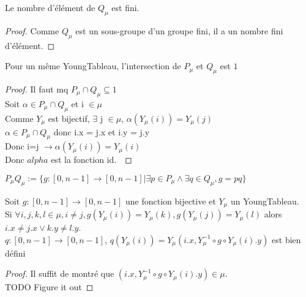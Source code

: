\begin{definition}[QuCard]
    \label{QuCard}
    \leanok
    Le nombre d'élément de $Q_{\mu}$ est fini.
\end{definition}
\begin{proof}
    \leanok
    Comme $Q_{\mu}$ est un sous-groupe d'un groupe fini, il a un nombre fini d'élément.
\end{proof}

\begin{lemma}[sectPuQu]
    \label{sectPuQu}
    \leanok
    Pour un même YoungTableau, l'intersection de $P_{\mu}$ et $Q_{\mu}$ est ${1}$
\end{lemma}
\begin{proof}
    \leanok
    Il faut mq $P_{\mu} \cap Q_{\mu} \subseteq {1}$\\
    Soit $\alpha \in P_{\mu} \cap Q_{\mu}$ et i $\in \mu$\\
    Comme $Y_{\mu}$ est bijectif, $\exists$ j $\in \mu$, $\alpha ( Y_{\mu} (i)) = Y_{\mu} (j)$\\
    $\alpha \in P_{\mu} \cap Q_{\mu}$ donc i.x = j.x et i.y = j.y\\
    Donc i=j $\to \alpha(Y_{\mu}(i))=Y_{\mu}(i)$\\
    Donc $alpha$ est la fonction id.\
\end{proof}

\begin{definition}[PuQu]
    \label{PuQu}
    \leanok
    $P_{\mu}Q_{\mu} := \{g : [0,n-1] \to [0,n-1] | \exists p \in P_{\mu} \land \exists q \in Q_{\mu}, g = p q \}$
\end{definition}

\begin{lemma}[qWellDefined]
    \label{qWellDefined}
    Soit $g : [0,n-1] \to [0,n-1]$ une fonction bijective et $Y_{\mu}$ un YoungTableau.\\
    Si $\forall i, j, k, l \in \mu, i \neq j, g(Y_{\mu}(i)) = Y_{\mu}(k), g(Y_{\mu}(j)) = Y_{\mu}(l)$ alors $i.x \neq j.x \lor k.y \neq l.y$.\\
    $q : [0,n-1] \to [0,n-1]$, $q(Y_{\mu}(i)) = Y_{\mu}(i.x,Y_{\mu}^{-1} \circ g \circ Y_{\mu}(i).y)$ est bien défini
\end{lemma}
\begin{proof}
    Il suffit de montré que $(i.x,Y_{\mu}^{-1} \circ g \circ Y_{\mu}(i).y) \in \mu$.\\
    TODO Figure it out
\end{proof}


